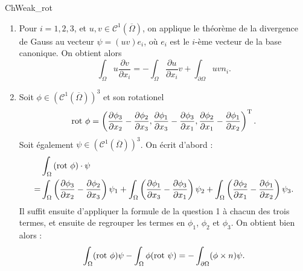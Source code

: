 \begin{corrige}{ChWeak_rot}

\begin{enumerate}

\item Pour $i=1,2,3$, et $u,v \in \mathcal{C}^1(\overline{\Omega})$, on applique le théorème de la divergence de Gauss au vecteur $\psi = (uv) e_i$, où $e_i$ est le $i$-ème vecteur de la base canonique. On obtient alors \[
\int_\Omega  u \frac{\partial v}{\partial x_i}
=
- \int_\Omega \frac{\partial u}{\partial x_i} v
+ \int_{\partial \Omega} { u v n_i}.
\]

\item Soit $\phi \in (\mathcal{C}^1(\overline{\Omega}))^3$ et son
rotationel 
\[
\hbox{rot } \phi = \left (
\frac{\partial \phi_3}{\partial x_2} - \frac{\partial \phi_2}{\partial x_3},
\frac{\partial \phi_1}{\partial x_3} - \frac{\partial \phi_3}{\partial x_1},
\frac{\partial \phi_2}{\partial x_1} - \frac{\partial \phi_1}{\partial x_2}
\right )^{\mathrm{T}}.
\]
Soit également $\psi \in (\mathcal{C}^1(\overline{\Omega}))^3$.
On écrit d'abord :
\begin{align*}
 & \int_\Omega \left ( \hbox{rot } \phi \right ) \cdot \psi \\
=& \int_\Omega \left (
\frac{\partial \phi_3}{\partial x_2} - \frac{\partial \phi_2}{\partial x_3}
\right ) \psi_1
+ \int_\Omega \left (
\frac{\partial \phi_1}{\partial x_3} - \frac{\partial \phi_3}{\partial x_1}
\right ) \psi_2
+ \int_\Omega \left (
\frac{\partial \phi_2}{\partial x_1} - \frac{\partial \phi_1}{\partial x_2}
\right ) \psi_3.
\end{align*}
Il suffit ensuite d'appliquer la formule de la question 1 à chacun des trois termes, et ensuite de regrouper les termes en $\phi_1$, $\phi_2$ et $\phi_3$. On obtient bien alors : 
\[
\int_\Omega  ( \hbox{rot } \phi ) \psi
- \int_\Omega \phi ( \hbox{rot } \psi)
= - \int_{\partial \Omega} ( \phi \times n ) \psi.
\]

\end{enumerate}

\end{corrige}

\medskip

